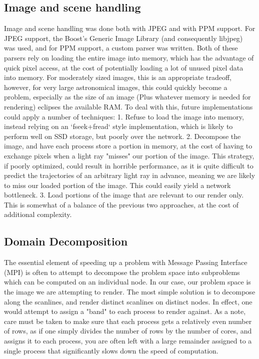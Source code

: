 \subsection{Image and scene handling}
Image and scene handling was done both with JPEG and with PPM support.
For JPEG support, the Boost's Generic Image Library
\cite{schaling_boost,bourdev2007generic} (and consequently libjpeg) was used, and for PPM support, a custom parser was written. Both of these parsers rely on loading the entire image into memory, which has the advantage of quick pixel access, at the cost of potentially loading a lot of unused pixel data into memory. For moderately sized images, this is an appropriate tradeoff, however, for very large astronomical images, this could quickly become a problem, especially as the size of an image (Plus whatever memory is needed for rendering) eclipses the available RAM. To deal with this, future implementations could apply a number of techniques:
1. Refuse to load the image into memory, instead relying on an `fseek+fread` style implementation, which is likely to perform well on SSD storage, but poorly over the network.
2. Decompose the image, and have each process store a portion in memory, at the cost of having to exchange pixels when a light ray "misses" our portion of the image. This strategy, if poorly optimized, could result in horrible performance, as it is quite difficult to predict the trajectories of an arbitrary light ray in advance, meaning we are likely to miss our loaded portion of the image. This could easily yield a network bottleneck.
3. Load portions of the image that are relevant to our render only. This is somewhat of a balance of the previous two approaches, at the cost of additional complexity. 


\subsection{Domain Decomposition}
The essential element of speeding up a problem with Message Passing Interface (MPI) \cite{mpi41} is often to attempt to decompose the problem space into subproblems which can be computed on an individual node. In our case, our problem space is the image we are attempting to render. The most simple solution is to decompose along the scanlines, and render distinct scanlines on distinct nodes. In effect, one would attempt to assign a "band" to each process to render against. As a note, care must be taken to make sure that each process gets a relatively even number of rows, as if one simply divides the number of rows by the number of cores, and assigns it to each process, you are often left with a large remainder assigned to a single process that significantly slows down the speed of computation.

